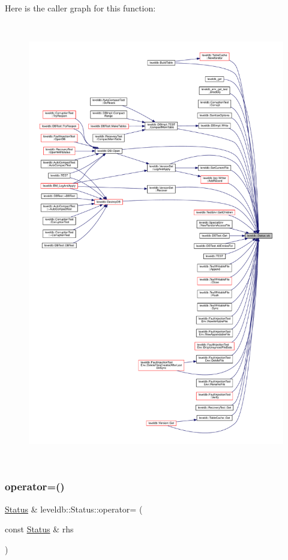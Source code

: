 Here is the caller graph for this function\+:
\nopagebreak
\begin{figure}[H]
\begin{center}
\leavevmode
\includegraphics[height=550pt]{classleveldb_1_1_status_af988e2a8d204019c14f21126d9300362_icgraph}
\end{center}
\end{figure}
\mbox{\label{classleveldb_1_1_status_a6c7bc85cbe92cba9146e269286838557}} 
\subsubsection{\texorpdfstring{operator=()}{operator=()}\hspace{0.1cm}{\footnotesize\ttfamily [1/2]}}
{\footnotesize\ttfamily \mbox{\hyperlink{classleveldb_1_1_status}{Status}} \& leveldb\+::\+Status\+::operator= (\begin{DoxyParamCaption}\item[{const \mbox{\hyperlink{classleveldb_1_1_status}{Status}} \&}]{rhs }\end{DoxyParamCaption})\hspace{0.3cm}{\ttfamily [inline]}}

